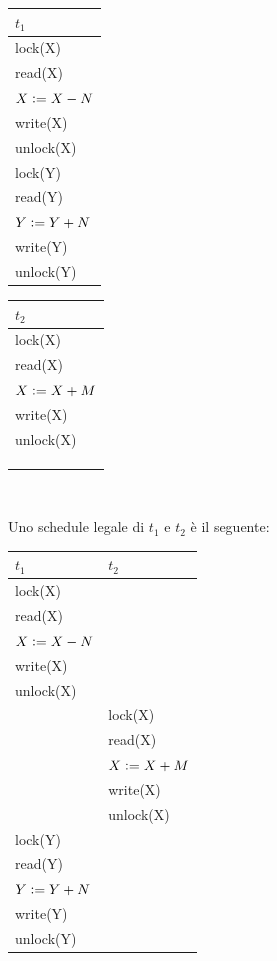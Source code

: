 \begin{multicols}{2}  

 \begin{tabular}{|l|}
   \hline
   $t_1$\\
   \hline
   lock(X)\\
   read(X)\\
   $X\vcentcolon=X-N$\\
   write(X)\\ 
   unlock(X)\\ 
   lock(Y)\\
   read(Y)\\
   $Y\vcentcolon=Y+N$\\
   write(Y)\\
   unlock(Y)\\
  \hline
 \end{tabular}
 
 \begin{tabular}{|l|}
  \hline
   $t_2$\\
   \hline
   lock(X)\\
   read(X)\\
   $X\vcentcolon=X+M$\\
   write(X)\\ 
   unlock(X)\\ 
  \\
  \\
  \\
  \hline
  \end{tabular}
  \\
 \end{multicols}

Uno schedule legale di $t_1$ e $t_2$ è il seguente:
\begin{center}
 \begin{tabular}{|l|l|}
 \hline
 $t_1$ & $t_2$\\
 \hline
   lock(X)&\\
   read(X)&\\
   $X\vcentcolon=X-N$&\\
   write(X)&\\ 
   unlock(X)&\\
   &lock(X)\\
   &read(X)\\
   &$X\vcentcolon=X+M$\\
   &write(X)\\ 
   &unlock(X)\\
   lock(Y)&\\
   read(Y)&\\
   $Y\vcentcolon=Y+N$&\\
   write(Y)&\\
   unlock(Y)&\\
   \hline
  \end{tabular}
\end{center}

